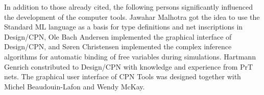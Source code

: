 In addition to those already cited, the following persons
significantly influenced the development of the computer
tools. Jawahar Malhotra got the idea to use the Standard ML language
as a basis for type definitions and net inscriptions in Design/CPN,
Ole Bach Andersen implemented the graphical interface of Design/CPN,
and S\o{}ren Christensen implemented the complex inference algorithms
for automatic binding of free variables during simulations. Hartmann
Genrich constributed to Design/CPN with knowledge and experience from
PrT nets. The graphical user interface of CPN Tools was designed
together with Michel Beaudouin-Lafon and Wendy McKay.





